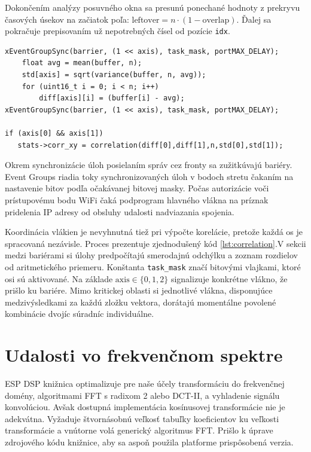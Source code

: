 Dokončením analýzy posuvného okna sa presunú ponechané hodnoty z prekryvu časových úsekov na začiatok
poľa: $\mathrm{leftover} = n \cdot (1 - \mathrm{overlap})$. Ďalej sa pokračuje prepisovaním už nepotrebných čísel od pozície \verb|idx|.

\begin{lstlisting}[style=cstyle,caption=Synchronizácia úloh na výpočet korelácie osí,label={lst:correlation},
morekeywords={xEventGroupSync}]
xEventGroupSync(barrier, (1 << axis), task_mask, portMAX_DELAY);
	float avg = mean(buffer, n);
	std[axis] = sqrt(variance(buffer, n, avg));
	for (uint16_t i = 0; i < n; i++)
		diff[axis][i] = (buffer[i] - avg);
xEventGroupSync(barrier, (1 << axis), task_mask, portMAX_DELAY);

if (axis[0] && axis[1])
   stats->corr_xy = correlation(diff[0],diff[1],n,std[0],std[1]);
\end{lstlisting}

Okrem synchronizácie úloh posielaním správ cez fronty sa zužitkúvajú bariéry. Event Groups riadia toky
synchronizovaných úloh v bodoch stretu čakaním na nastavenie bitov podľa očakávanej bitovej masky. Počas
autorizácie voči prístupovému bodu WiFi čaká podprogram hlavného vlákna na príznak pridelenia IP adresy
od obsluhy udalosti nadviazania spojenia.

Koordinácia vlákien je nevyhnutná tiež pri výpočte korelácie, pretože každá os je spracovaná nezávisle. Proces
prezentuje zjednodušený kód \ref{lst:correlation}.V sekcii medzi bariérami si úlohy predpočítajú smerodajnú odchýlku a zoznam rozdielov
od aritmetického priemeru. Konštanta \verb|task_mask| značí bitovými vlajkami, ktoré osi sú aktivované.
Na základe $\mathrm{axis} \in \{0,1,2\}$ signalizuje konkrétne vlákno, že prišlo ku bariére. Mimo kritickej oblasti
si jednotlivé vlákna, disponujúce medzivýsledkami za každú zložku vektora, dorátajú momentálne povolené
kombinácie dvojíc súradníc individuálne.

\section{Udalosti vo frekvenčnom spektre}
ESP DSP knižnica optimalizuje pre naše účely transformáciu do frekvenčnej domény, algoritmami FFT s radixom 2 alebo DCT-II,
a vyhladenie signálu konvolúciou. Avšak dostupná implementácia kosínusovej transformácie nie je adekvátna.
Vyžaduje štvornásobnú veľkosť tabuľky koeficientov ku veľkosti transformácie a vnútorne volá generický
algoritmus FFT. Prišlo k úprave zdrojového kódu knižnice, aby sa aspoň použila platforme prispôsobená verzia.

